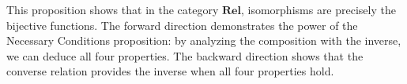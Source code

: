 \begin{remark}
This proposition shows that in the category $\mathbf{Rel}$, isomorphisms are precisely the bijective functions. The forward direction demonstrates the power of the Necessary Conditions proposition: by analyzing the composition with the inverse, we can deduce all four properties. The backward direction shows that the converse relation provides the inverse when all four properties hold.
\end{remark}



